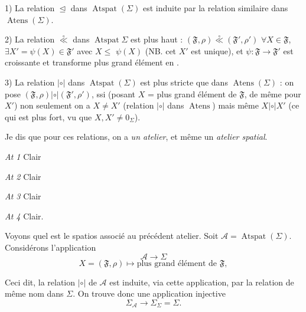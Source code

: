 \documentclass[11pt,a4paper]{article}
\begin{document}
1) La relation $\trianglelefteq$ dans $\operatorname{Atspat}(\Sigma)$ est
induite par la relation similaire dans $\operatorname{Atens}(\Sigma)$.

2) La relation $\overset{\circ}{\ll}$ dans $\operatorname{Atspat} \Sigma$ est
   plus haut :
$(\mathfrak{F}, \rho) \overset{\circ}{\ll} (\mathfrak{F}', \rho')$
  $\forall X \in \mathfrak{F}$, $\exists X' = \psi(X) \in
\mathfrak{F}'$ avec $X \leq$  $\psi(X)$ (NB.
\struck{\ill{}} cet $X'$ est unique), et
$\psi : \mathfrak{F} \to \mathfrak{F}'$ est croissante \struck{\ill{}} et
transforme plus grand élément en .

3) La relation $\mathrel{|\circ|}$ dans $\operatorname{Atspat}(\Sigma)$ est
\struck{\ill{}} plus stricte que dans $\operatorname{Atens}(\Sigma)$ : on pose
$(\mathfrak{F}, \rho) \mathrel{|\circ|} (\mathfrak{F}', \rho')$, ssi (posant
$X$ = plus grand élément de $\mathfrak{F}$, de même pour $X'$) non seulement on
a $X \neq X'$ (relation $\mathrel{|\circ|}$ dans $\operatorname{Atens}$) mais
même $X \mathrel{|\circ|} X'$ (ce qui est plus fort, vu que $X, X' \neq
0_{\Sigma}$).

Je dis que pour ces relations, on a \emph{un atelier},  et
même \ill{} un \emph{atelier spatial}.


\emph{ At 1} \quad Clair

\emph{At 2} \quad Clair 

\emph{At 3} \quad Clair

\emph{At 4} \quad Clair.

\struck{\ill{}} Voyons quel est le  \struck{\ill{}}
spatios associé au précédent atelier. \struck{\ill{}} Soit
$\mathcal{A} = \operatorname{Atspat}(\Sigma)$. Considérons
 l'application
\[
  \mathcal{A} \longrightarrow \Sigma
\]
\[
  X = (\mathfrak{F}, \rho) \longmapsto \text{plus grand élément de } \mathfrak{F},
\]

Ceci dit, la relation $\mathrel{|\circ|}$ de $\mathcal{A}$ est induite, via
cette application, par la relation \struck{\ill{}} de même nom
dans $\Sigma$. On trouve donc une application injective
\[
  \Sigma_{\mathcal{A}} \longrightarrow \Sigma_{\Sigma} = \Sigma .
\]
\end{document}
